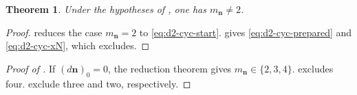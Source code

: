 \documentclass[11pt,letterpaper]{article}
\numberwithin{equation}{section}
\newtheorem{theorem}[theorem]{Theorem}
\theoremstyle{remark}
\theoremstyle{plain}
\begin{document}
\begin{theorem}
\label{thm:dtwo}
Under the hypotheses of , one has
$m_{\boldsymbol{n}}\neq2$.
\end{theorem}

\begin{proof}
 reduces the case
$m_{\boldsymbol{n}}=2$ to
\eqref{eq:d2-cyc-start}.  
gives \eqref{eq:d2-cyc-prepared} and \eqref{eq:d2-cyc-xN}, which
 excludes.
\end{proof}

\begin{proof}[Proof of ]
If $(d\boldsymbol{n})_0=0$, the reduction theorem
\cite[Theorem~1.1]{PortillaReduction} gives
$m_{\boldsymbol{n}}\in\{2,3,4\}$.   excludes
four.   exclude three and
two, respectively.
\end{proof}

\printbibliography
\end{document}
